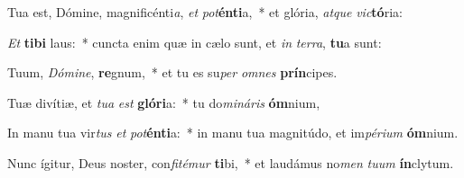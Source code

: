 \item Tua est, Dómine, magnificénti\textit{a}, \textit{et} \textit{pot}\textbf{én}\textbf{ti}a,~* et glória, \textit{at}\textit{que} \textit{vic}\textbf{tó}ria:
\item \textit{Et} \textbf{ti}\textbf{bi} laus:~* cuncta enim quæ in cælo sunt, et \textit{in} \textit{ter}\textit{ra}, \textbf{tu}a sunt:
\item Tuum, \textit{Dó}\textit{mi}\textit{ne}, \textbf{re}gnum,~* et tu es su\textit{per} \textit{om}\textit{nes} \textbf{prín}cipes.
\item Tuæ divítiæ, et \textit{tu}\textit{a} \textit{est} \textbf{gló}\textbf{ri}a:~* tu do\textit{mi}\textit{ná}\textit{ris} \textbf{óm}nium,
\item In manu tua vir\textit{tus} \textit{et} \textit{pot}\textbf{én}\textbf{ti}a:~* in manu tua magnitúdo, et im\textit{pé}\textit{ri}\textit{um} \textbf{óm}nium.
\item Nunc ígitur, Deus noster, con\textit{fi}\textit{té}\textit{mur} \textbf{ti}bi,~* et laudámus no\textit{men} \textit{tu}\textit{um} \textbf{ín}clytum.
